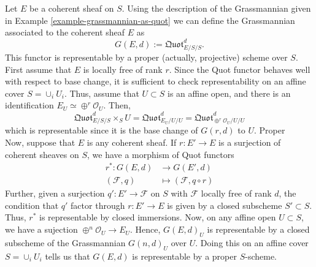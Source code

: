\documentclass[ignorenonframetext,t]{beamer}
\newcommand{\sF}{{\mathcal F}}
\newcommand{\sO}{{\mathcal O}}
\theoremstyle{definition}
\begin{document}
\begin{example}
	Let $E$ be a coherent sheaf on $S$. Using the description of the Grassmannian given in Example \ref{example-grassmannian-as-quot} we can define the Grassmannian associated to the coherent sheaf $E$ as
	\[G(E,d):=\mathfrak{Quot}^d_{E/S/S}.\] 
	This functor is representable by a proper (actually, projective) scheme over $S$.\\
	First assume that $E$ is locally free of rank $r$. Since the Quot functor behaves well with respect to base change, it is sufficient to check representability on an affine cover $S=\cup_i U_i$. Thus, assume that $U\subset S$ is an affine open, and there is an identification $E_U\simeq \oplus^r\sO_U$. Then,
	\[\mathfrak{Quot}^d_{E/S/S}\times_S U = \mathfrak{Quot}^d_{E_U/U/U}=\mathfrak{Quot}^d_{\oplus^r\sO_U/U/U}\]
	which is representable since it is the base change of $G(r,d)$ to $U$. Proper\\
	Now, suppose that $E$ is any coherent sheaf. If $r: E'\rightarrow E$ is a surjection of coherent sheaves on $S$, we have a morphism of Quot functors
	\begin{align*}
	r^*: G(E,d) &\rightarrow G(E',d)\\
	(\sF,q) &\mapsto (\sF,q\circ r)
	\end{align*}
	Further, given a surjection $q':E'\rightarrow\sF$ on $S$ with $\sF$ locally free of rank $d$, the condition that $q'$ factor through $r:E'\rightarrow E$ is given by a closed subscheme $S'\subset S$. Thus, $r^*$ is representable by closed immersions. Now, on any affine open $U\subset S$, we have a sujection $\oplus^n\sO_U\rightarrow E_U$. Hence, $G(E,d)_U$ is representable by a closed subscheme of the Grassmannian $G(n,d)_U$ over $U$. Doing this on an affine cover $S=\cup_i U_i$ tells us that $G(E,d)$ is representable by a proper $S$-scheme.
\end{example}




\end{document}
